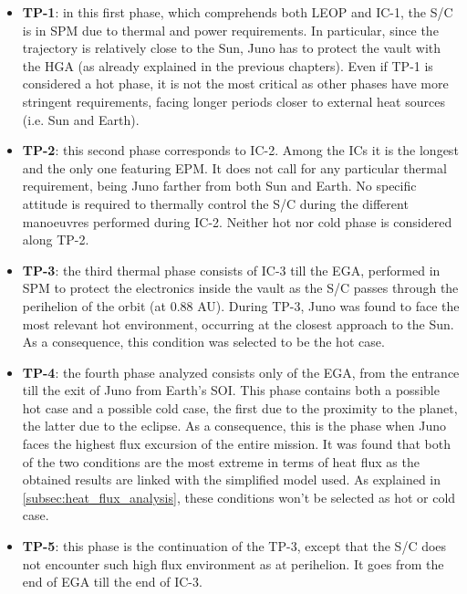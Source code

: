 \begin{itemize}
    \item \textbf{TP-1}:
    in this first phase, which comprehends both LEOP and IC-1, the S/C is in SPM due to thermal and power requirements. In particular, since the trajectory is relatively close to the Sun, Juno has to protect the vault with the HGA (as already explained in the previous chapters).
    Even if TP-1 is considered a hot phase, it is not the most critical as other phases have more stringent requirements, facing longer periods closer to external heat sources (i.e. Sun and Earth).

    \item \textbf{TP-2}:
    this second phase corresponds to IC-2. Among the ICs it is the longest and the only one featuring EPM. It does not call for any particular thermal requirement, being Juno farther from both Sun and Earth.
    No specific attitude is required to thermally control the S/C during the different manoeuvres performed during IC-2. Neither hot nor cold phase is considered along TP-2.
    
    \item \textbf{TP-3}:
    the third thermal phase consists of IC-3 till the EGA, performed in SPM to protect the electronics inside the vault as the S/C passes through the perihelion of the orbit (at 0.88 AU).
    During TP-3, Juno was found to face the most relevant hot environment, occurring at the closest approach to the Sun. As a consequence, this condition was selected to be the hot case.
    
    \item \textbf{TP-4}:
    the fourth phase analyzed consists only of the EGA, from the entrance till the exit of Juno from Earth's SOI. This phase contains both a possible hot case and a possible cold case, the first due to the proximity to the planet, the latter due to the eclipse.
    As a consequence, this is the phase when Juno faces the highest flux excursion of the entire mission.
    It was found that both of the two conditions are the most extreme in terms of heat flux as the obtained results are linked with the simplified model used.
    As explained in \autoref{subsec:heat_flux_analysis}, these conditions won't be selected as hot or cold case.

    \item \textbf{TP-5}:
    this phase is the continuation of the TP-3, except that the S/C does not encounter such high flux environment as at perihelion. It goes from the end of EGA till the end of IC-3.
    

\end{itemize}
